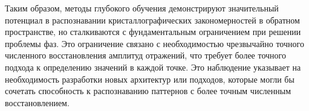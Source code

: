 Таким образом, методы глубокого обучения демонстрируют значительный потенциал в распознавании кристаллографических закономерностей в обратном пространстве, но сталкиваются с фундаментальным ограничением при решении проблемы фаз. Это ограничение связано с необходимостью чрезвычайно точного численного восстановления амплитуд отражений, что требует более точного подхода к определению значений в каждой точке. Это наблюдение указывает на необходимость разработки новых архитектур или подходов, которые могли бы сочетать способность к распознаванию паттернов с более точным численным восстановлением.






